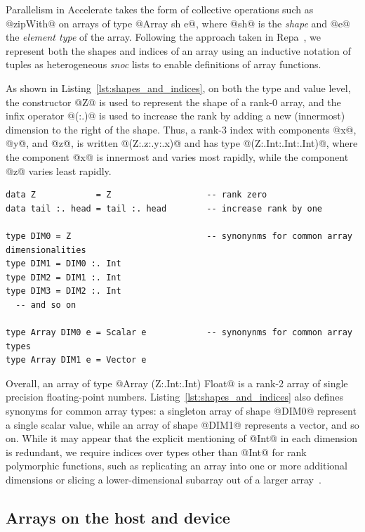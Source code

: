 Parallelism in Accelerate takes the form of collective operations such as
@zipWith@ on arrays of type @Array sh e@, where @sh@ is the \emph{shape} and @e@
the \emph{element type} of the array. Following the approach taken in
Repa~\cite{Keller:2010er}, we represent both the shapes and indices of an array
using an inductive notation of tuples as heterogeneous \emph{snoc} lists to
enable  definitions of array functions.

As shown in Listing~\ref{lst:shapes_and_indices}, on both the type and value
level, the constructor @Z@ is used to represent the shape of a rank-0 array, and
the infix operator @(:.)@ is used to increase the rank by adding a new (innermost)
dimension to the right of the shape. Thus, a rank-3 index with components @x@,
@y@, and @z@, is written @(Z:.z:.y:.x)@ and has type @(Z:.Int:.Int:.Int)@, where
the component @x@ is innermost and varies most rapidly, while the component @z@
varies least rapidly.

\begin{lstlisting}[style=haskell_float
    ,label=lst:shapes_and_indices
    ,caption={Types of array shapes and indices}]
data Z            = Z                   -- rank zero
data tail :. head = tail :. head        -- increase rank by one

type DIM0 = Z                           -- synonynms for common array dimensionalities
type DIM1 = DIM0 :. Int
type DIM2 = DIM1 :. Int
type DIM3 = DIM2 :. Int
  -- and so on

type Array DIM0 e = Scalar e            -- synonynms for common array types
type Array DIM1 e = Vector e
\end{lstlisting}

Overall, an array of type @Array (Z:.Int:.Int) Float@ is a rank-2 array of
single precision floating-point numbers. Listing~\ref{lst:shapes_and_indices}
also defines synonyms for common array types: a singleton array of shape @DIM0@
represent a single scalar value, while an array of shape @DIM1@ represents a
vector, and so on. While it may appear that the explicit mentioning of @Int@ in
each dimension is redundant, we require indices over types other than @Int@ for
rank polymorphic functions, such as replicating an array into one or more
additional dimensions or slicing a lower-dimensional subarray out of a larger
array~\cite{Keller:2010er,Chakravarty:2011fr}.


\subsection{Arrays on the host and device}
\label{sec:arrays_on_the_host_and_device}

